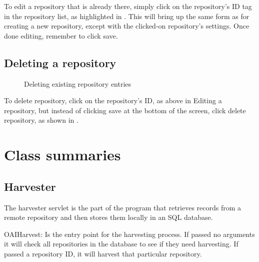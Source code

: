 \documentclass[a4paper,11pt]{article}
\begin{document}
To edit a repository that is already there, simply click on the repository's ID tag in the repository list, as highlighted in .
This will bring up the same form as for creating a new repository, except with the clicked-on repository's settings. Once done editing, remember to click save.

\subsection{Deleting a repository}

\begin{figure}[h]
 \centering
 \caption{Deleting existing repository entries}
 \label{deleting_repository_entry}
\end{figure}

To delete repository, click on the repository's ID, as above in Editing a repository, but instead of clicking save at the bottom of the screen, click delete repository, as shown in .

\section{Class summaries}

\subsection{Harvester}

The harvester servlet is the part of the program that retrieves records from a remote repository and then stores them locally in an SQL database.

OAIHarvest: Is the entry point for the harvesting process. If passed no arguments it will check all repositories in the database to see if they need harvesting. If passed a repository ID, it will harvest that particular repository.
\end{document}
